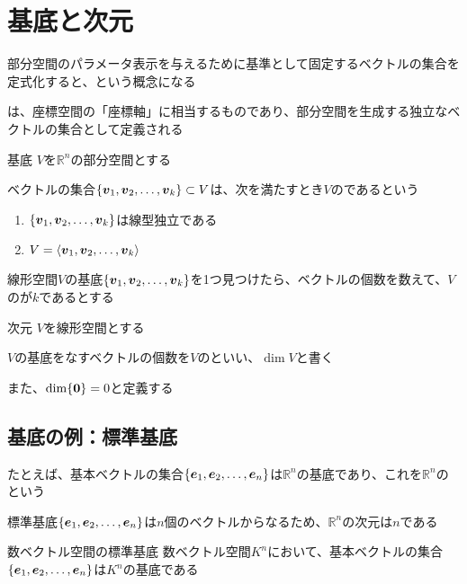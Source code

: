 \documentclass[../../../topic_linear-algebra]{subfiles}
\begin{document}
\sectionline
\section{基底と次元}

部分空間のパラメータ表示を与えるために基準として固定するベクトルの集合を定式化すると、という概念になる

\br

は、座標空間の「座標軸」に相当するものであり、部分空間を生成する独立なベクトルの集合として定義される

\begin{definition}{基底}
  $V$を$\mathbb{R}^n$の部分空間とする

  ベクトルの集合$\{ \vb*{v}_1, \vb*{v}_2, \dots, \vb*{v}_k \} \subset V$は、次を満たすとき$V$のであるという
  \begin{enumerate}[label=\romanlabel]
    \item $\{ \vb*{v}_1, \vb*{v}_2, \dots, \vb*{v}_k \}$は線型独立である
    \item $V = \langle \vb*{v}_1, \vb*{v}_2, \dots, \vb*{v}_k \rangle$
  \end{enumerate}
\end{definition}

線形空間$V$の基底$\{ \vb*{v}_1, \vb*{v}_2, \dots, \vb*{v}_k \}$を1つ見つけたら、ベクトルの個数を数えて、$V$のが$k$であるとする

\begin{definition}{次元}
  $V$を線形空間とする

  $V$の基底をなすベクトルの個数を$V$のといい、$\dim V$と書く

  また、$\dim\{\vb*{0}\} = 0$と定義する
\end{definition}

\subsection{基底の例：標準基底}

たとえば、基本ベクトルの集合$\{ \vb*{e}_1, \vb*{e}_2, \dots, \vb*{e}_n \}$は$\mathbb{R}^n$の基底であり、これを$\mathbb{R}^n$のという

標準基底$\{ \vb*{e}_1, \vb*{e}_2, \dots, \vb*{e}_n \}$は$n$個のベクトルからなるため、$\mathbb{R}^n$の次元は$n$である

\begin{theorem}{数ベクトル空間の標準基底}
  数ベクトル空間$K^n$において、基本ベクトルの集合$\{ \vb*{e}_1, \vb*{e}_2, \dots, \vb*{e}_n \}$は$K^n$の基底である
\end{theorem}
\end{document}
